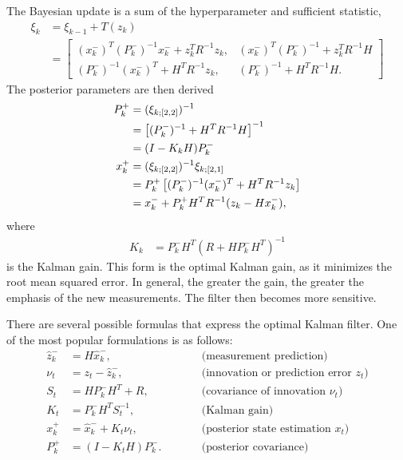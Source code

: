 The Bayesian update is a sum of the hyperparameter and sufficient statistic,
\begin{align}
    \xi_{k}
    &= \xi_{k-1} +  T(z_{k})  \nonumber \\
    &=
    \begin{bmatrix}
    (x_{k}^{-})^{T} (P_{k}^{-})^{-1} x_{k}^{-} + z_{k}^{T} R^{-1} z_{k},
    & (x_{k}^{-})^{T} (P_{k}^{-})^{-1} + z_{k}^{T} R^{-1} H \\
    (P_{k}^{-})^{-1} (x_{k}^{-})^{T} + H^{T} R^{-1} z_{k},
    & (P_{k}^{-})^{-1} + H^{T} R^{-1} H.
    \end{bmatrix}
\end{align}
The posterior parameters are then derived
\begin{align}
    P_{k}^{+} &= (\xi_{k;[2,2]})^{-1} \notag\\
    &= \left[ (P_{k}^{-})^{-1} + H^{T} R^{-1} H \right]^{-1} \notag\\
    &= (I - K_{k} H) P_{k}^{-} \\
    x_{k}^{+} &= (\xi_{k;[2,2]})^{-1} \xi_{k;[2,1]} \notag\\
    &= P_{k}^{+} \left[ (P_{k}^{-})^{-1} (x_{k}^{-})^{T} + H^{T} R^{-1} z_{k}\right] \notag \\
    &= x_{k}^{-} + P_{k}^{+} H^{T} R^{-1}(z_{k} - Hx_{k}^{-}),
\end{align}
where
\begin{align}
    K_{k} &= P_{k}^{-} H^{T}(R + H P_{k}^{-}H^{T})^{-1} \label{eq:kalman_gain}
\end{align}
is the Kalman gain. This form is the optimal Kalman gain, as it minimizes the root mean squared error. In general, the
greater the gain, the greater the emphasis of the new measurements. The filter then becomes more sensitive.

There are several possible formulas that express the optimal Kalman filter. One of the most popular formulations is
as follows:
\begin{align}
    \hat{z}_{k}^{-} &= H \hat{x}_{k}^{-}, \qquad &&\text{(measurement prediction)} \\
    \nu_t &= z_t - \hat{z}_{k}^{-}, \qquad &&\text{(innovation or prediction error $z_t$)} \\
    S_t &= H P_{k}^{-} H^T + R, \qquad &&\text{(covariance of innovation $\nu_t$)} \\
    K_t &= P_{k}^{-} H^T S_t^{-1}, \qquad &&\text{(Kalman gain)} \\
    {x}_{k}^{+} &= \hat{x}_{k}^{-} + K_t \nu_t, \qquad &&\text{(posterior state estimation $x_t$)} \\
    P_{k}^{+} &= (I - K_t H) P_{k}^{-}. \qquad &&\text{(posterior covariance)}
\end{align}

